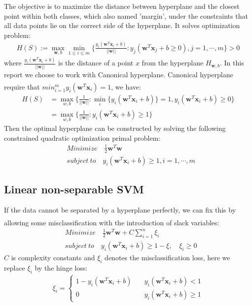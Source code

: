 \documentclass{article}
\newcommand{\upcite}[1]{\textsuperscript{\textsuperscript{\cite{#1}}}}
\begin{document}
\begin{spacing}{1.5}
The objective is to maximize the distance between hyperplane and the closest point within both classes, which also named 'margin', under the constraints that all data points lie on the correct side of the hyperplane. It solves optimization problem:
\begin{align}
H(S):=\max_{\bm{w},b} \min_{1\le i \le m}\{\frac{y_i(\bm{w}^T\bm{x}_i+b)}{||\bm{w}||}: y_j(\bm{w}^T\bm{x}_j+b\ge 0), j=1,\cdots,m\}>0
\end{align}
where $\frac{y_i(\bm{w}^T\bm{x}_i+b)}{||\bm{w}||}$ is the distance of a point $x$ from the hyperplane $H_{\bm{w},b}$. In this report we choose to work with Canonical hyperplane. Canonical hyperplane require that $min^m_{i=1}y_i(\bm{w}^T\bm{x}_i)=1$\upcite{Ref5}, we have:
\begin{align}
H(S)&=\max_{w,b}\{\frac{1}{||\bm{w}||}: \min_{i}\{y_i(\bm{w}^T\bm{x}_i+b)\}=1, y_i(\bm{w}^T\bm{x}_i+b)\ge0 \}\\
&=\max_{w,b}\{\frac{1}{||\bm{w}||}: y_i(\bm{w}^T\bm{x}_i+b)\ge 1\}
\end{align}
Then the optimal hyperplane can be constructed by solving the following constrained quadratic optimization primal problem:
\begin{align}
&Minimize\quad \frac{1}{2}\bm{w}^T\bm{w}\\
&subject\ to \quad y_i(\bm{w}^T\bm{x}_i+b)\ge1, i=1,\cdots,m
\end{align}

\subsection{Linear non-separable SVM}
If the data cannot be separated by a hyperplane perfectly, we can fix this by allowing some misclassification with the introduction of slack variables\upcite{Ref3}:
\begin{align}
&Minimize\quad \frac{1}{2}\bm{w}^T\bm{w}+C\sum^n_{i=1}\xi_i\\
&subject\ to \quad y_i(\bm{w}^T\bm{x}_i+b)\ge1-\xi,\quad \xi_i\ge0
\end{align}
$C$ is complexity constants and $\xi_i$ denotes the misclassification loss, here we replace $\xi_i$ by the hinge loss:
\begin{align}
\xi_i=\left\{
\begin{aligned}
1-y_i(\bm{w}^T\bm{x}_i+b)&\quad y_i(\bm{w}^T\bm{x}_i+b)<1\\
0 &\quad y_i(\bm{w}^T\bm{x}_i+b)\ge1
\end{aligned}
\right.
\end{align}


\end{spacing}
\end{document}
